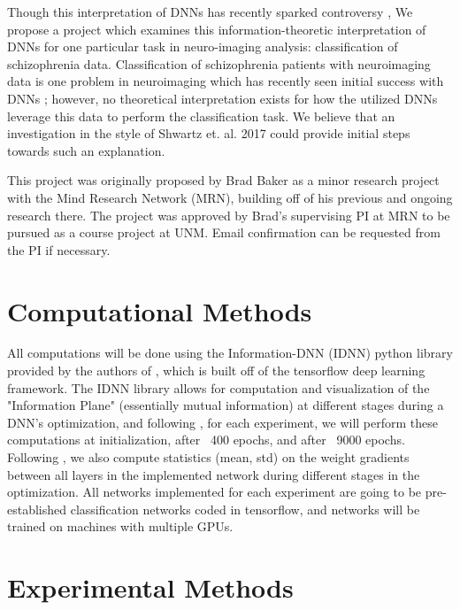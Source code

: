 \documentclass[conference, 5pt]{IEEEtran}
\begin{document}
Though this interpretation of DNNs has recently sparked controversy \cite{saxe2018information,amjad2018information}, We propose a project which examines this information-theoretic interpretation of DNNs for one particular task in neuro-imaging analysis: classification of schizophrenia data. Classification of schizophrenia patients with neuroimaging data is one problem in neuroimaging which has recently seen initial success with DNNs \cite{plis2014deep,kim2016deep,han2017schizophrenia}; however, no theoretical interpretation exists for how the utilized DNNs leverage this data to perform the classification task. We believe that an investigation in the style of Shwartz et. al. 2017 \cite{shwartz2017opening} could provide initial steps towards such an explanation. 

This project was originally proposed by Brad Baker as a minor research project with the Mind Research Network (MRN), building off of his previous and ongoing research there. The project was approved by Brad's supervising PI at MRN to be pursued as a course project at UNM. Email confirmation can be requested from the PI if necessary.

\section{Computational Methods}

All computations will be done using the Information-DNN (IDNN) python library provided by the authors of \cite{shwartz2017opening}, which is built off of the tensorflow deep learning framework. The IDNN library allows for computation and visualization of the "Information Plane" (essentially mutual information) at different stages during a DNN's optimization, and following \cite{shwartz2017opening}, for each experiment, we will perform these computations at initialization, after ~400 epochs, and after ~9000 epochs. Following \cite{shwartz2017opening}, we also compute statistics (mean, std) on the weight gradients between all layers in the implemented network during different stages in the optimization. All networks implemented for each experiment are going to be pre-established classification networks coded in tensorflow, and networks will be trained on machines with multiple GPUs.

\section{Experimental Methods}
\end{document}
